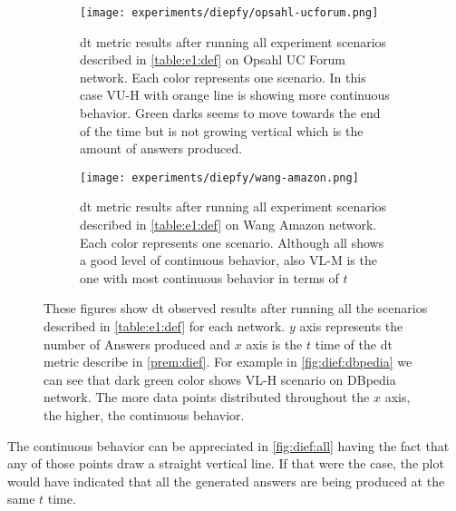 \begin{figure}[!htp]
  \begin{subfigure}[t]{0.45\textwidth}
   \texttt{[image: experiments/diepfy/opsahl-ucforum.png]}
    \caption[{[EE] \acrshort{dt} Results: Opsahl UC Forum}]{\acrshort{dt} metric results after running all experiment scenarios described in \autoref{table:e1:def} on Opsahl UC Forum network. Each color represents one scenario. In this case VU-H with orange line is showing more continuous behavior. Green darks seems to move towards the end of the time but is not growing vertical which is the amount of answers produced.}
    \label{fig:dief:opsahl}
  \end{subfigure}\hfill
  \begin{subfigure}[t]{0.45\textwidth}
    \texttt{[image: experiments/diepfy/wang-amazon.png]}
     \caption[{[EE] \acrshort{dt} Results: Wang Amazon}]{\acrshort{dt} metric results after running all experiment scenarios described in \autoref{table:e1:def} on Wang Amazon network. Each color represents one scenario. Although all shows a good level of continuous behavior, also VL-M is the one with most continuous behavior in terms of $t$}
     \label{fig:dief:wang}
   \end{subfigure}
   \caption[{[EE] \acrshort{dt} General Results}]{These figures show \acrshort{dt} observed results after running all the scenarios described in \autoref{table:e1:def} for each network. $y$ axis represents the number of Answers produced and $x$ axis is the $t$ time of the \acrshort{dt} metric describe in \autoref{prem:dief}. For example in \autoref{fig:dief:dbpedia} we can see that dark green color shows VL-H scenario on DBpedia network. The more data points distributed throughout the $x$ axis, the higher, the continuous behavior.}
   \label{fig:dief:all}
 \end{figure}

The continuous behavior can be appreciated in \autoref{fig:dief:all} having the fact that any of those points draw a straight vertical line. 
If that were the case, the plot would have indicated that all the generated answers are being produced at the same $t$ time.


